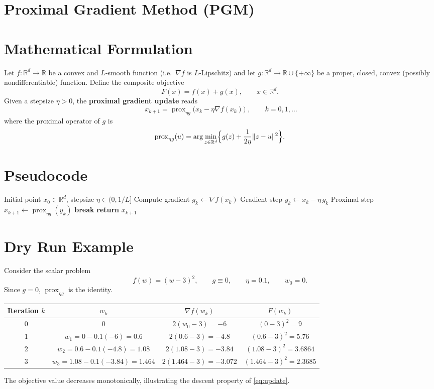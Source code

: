 \documentclass{article}
\newcommand{\prox}{\operatorname{prox}}
\newcommand{\R}{\mathbb{R}}
\begin{document}
\section*{Proximal Gradient Method (PGM)}

\section*{Mathematical Formulation}
Let $f:\R^{d}\rightarrow\R$ be a convex and $L$‑smooth function (i.e.~$\nabla f$ is $L$‑Lipschitz) and let $g:\R^{d}\rightarrow\R\cup\{+\infty\}$ be a proper, closed, convex (possibly nondifferentiable) function.  
Define the composite objective
\[
F(x)=f(x)+g(x),\qquad x\in\R^{d}.
\]
Given a stepsize $\eta>0$, the \textbf{proximal gradient update} reads
\begin{equation}
\boxed{\;x_{k+1}= \prox_{\eta g}\!\bigl(x_{k}-\eta\nabla f(x_{k})\bigr)\;},\qquad k=0,1,\dots
\label{eq:update}
\end{equation}
where the proximal operator of $g$ is
\[
\prox_{\eta g}(u)=\arg\min_{z\in\R^{d}}\Bigl\{g(z)+\frac{1}{2\eta}\|z-u\|^{2}\Bigr\}.
\]

\section*{Pseudocode}
\begin{algorithm}[H]
\caption{Proximal Gradient Method}
\begin{algorithmic}[1]
\Require Initial point $x_{0}\in\R^{d}$, stepsize $\eta\in(0,1/L]$ 
    \State Compute gradient $g_{k}\gets\nabla f(x_{k})$
    \State Gradient step $y_{k}\gets x_{k}-\eta\,g_{k}$
    \State Proximal step $x_{k+1}\gets\prox_{\eta g}(y_{k})$
        \State \textbf{break}
    \EndIf
\EndFor
\State \textbf{return} $x_{k+1}$
\end{algorithmic}
\end{algorithm}

\section*{Dry Run Example}
Consider the scalar problem
\[
f(w)=(w-3)^{2},\qquad g\equiv0,\qquad \eta=0.1,\qquad w_{0}=0.
\]
Since $g=0$, $\prox_{\eta g}$ is the identity.

\begin{center}
\begin{tabular}{c|c|c|c}
Iteration $k$ & $w_{k}$ & $\nabla f(w_{k})$ & $F(w_{k})$ \\ \hline
0 & $0$ & $2(w_{0}-3)=-6$ & $(0-3)^{2}=9$ \\
1 & $w_{1}=0-0.1(-6)=0.6$ & $2(0.6-3)=-4.8$ & $(0.6-3)^{2}=5.76$ \\
2 & $w_{2}=0.6-0.1(-4.8)=1.08$ & $2(1.08-3)=-3.84$ & $(1.08-3)^{2}=3.6864$ \\
3 & $w_{3}=1.08-0.1(-3.84)=1.464$ & $2(1.464-3)=-3.072$ & $(1.464-3)^{2}=2.3685$
\end{tabular}
\end{center}
The objective value decreases monotonically, illustrating the descent property of \eqref{eq:update}.
\end{document}
